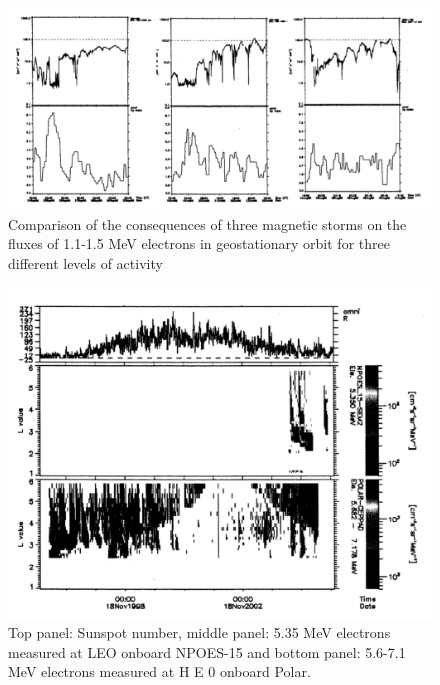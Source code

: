 \documentclass[./dissertation.tex]{subfiles}
\begin{document}
\begin{figure}[h!]
\centering
  \includegraphics[scale = 0.50]{imgs/radbelt8.png}
  \caption{Comparison of the consequences of three magnetic storms on the fluxes of 1.1-1.5 MeV electrons in geostationary orbit for three different levels of activity \cite{bib2}}
  \label{fig:radbel8}
\end{figure}

\begin{figure}[h!]
\centering
  \includegraphics[scale = 0.50]{imgs/radbelt9.png}
  \caption{Top panel: Sunspot number, middle panel: 5.35 MeV electrons measured at LEO onboard NPOES-15 and bottom panel: 5.6-7.1 MeV electrons measured at H E 0 onboard Polar. \cite{bib2}}
  \label{fig:radbel9}
\end{figure}
\end{document}
